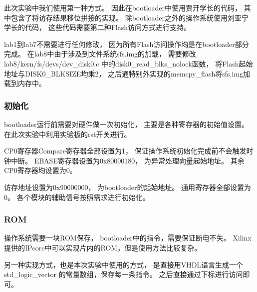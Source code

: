             此次实验中我们使用第一种方式。%
            因此在bootloader中使用贾开学长的代码，%
            其中包含了将访存结果移位拼接的实现。%
            除bootloader之外的操作系统使用刘亚宁学长的代码，%
            这些代码需要第二种Flash访问方式进行支持。

            lab1到lab7不需要进行任何修改，%
            因为所有Flash访问操作均是在bootloader部分完成。%
            在lab8中由于涉及到文件系统sfs.img的加载，%
            需要修改lab8/kern/fs/devs/dev\_disk0.c%
            中的disk0\_read\_blks\_nolock函数，%
            将Flash起始地址与DISK0\_BLKSIZE均乘2，%
            之后通特别外实现的memcpy\_flash将sfs.img加载到内存中。

        \subsubsection{初始化}
            bootloader运行前需要对硬件做一次初始化，%
            主要是各种寄存器的初始值设置。%
            在此次实验中利用实验板的rst开关进行。

            CP0寄存器Compare寄存器全部设置为1，%
            保证操作系统初始化完成前不会触发时钟中断。%
            EBASE寄存器设置为0x80000180，%
            为异常处理向量起始地址。%
            其余CP0寄存器均设置为0。

            访存地址设置为0x90000000，%
            为bootloader的起始地址。%
            通用寄存器全部设置为0。%
            各个模块的辅助信号按照需求进行初始化。%

        \subsubsection{ROM}
            操作系统需要一块ROM保存，%
            bootloader中的指令，需要保证断电不失。%
            Xilinx提供的IPcore中可以实现片内的ROM，但是使用方法比较复杂。

            另一种实现方式，也是本次实验中使用的方式，%
            是直接用VHDL语言生成一个std\_logic\_vector%
            的常量数组，保存每一条指令。%
            之后直接通过下标进行访问即可。%
            
